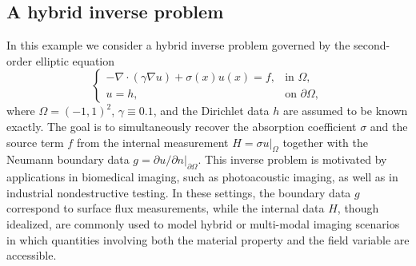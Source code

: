 \documentclass{article}
\numberwithin{equation}{section}
\begin{document}
\subsection{A hybrid inverse problem}
\label{subsec:IP}

In this example we consider a hybrid inverse problem governed by the second-order elliptic equation
\begin{equation}
\begin{cases}
-\nabla\cdot(\gamma\nabla u)+\sigma(x)u(x)=f,
& \text{in }\Omega,\\
u=h,
& \text{on }\partial\Omega,
\end{cases}
\end{equation}
where $\Omega=(-1,1)^2$, $\gamma\equiv0.1$, and the Dirichlet data $h$ are assumed to be known exactly. The goal is to simultaneously recover the absorption coefficient $\sigma$ and the source term $f$ from the internal measurement $H=\sigma u|_{\Omega}$ together with the Neumann boundary data $g=\partial u/\partial n|_{\partial\Omega}$. This inverse problem is motivated by applications in biomedical imaging, such as photoacoustic imaging, as well as in industrial nondestructive testing. In these settings, the boundary data $g$ correspond to surface flux measurements, while the internal data $H$, though idealized, are commonly used to model hybrid or multi-modal imaging scenarios in which quantities involving both the material property and the field variable are accessible.
\end{document}
